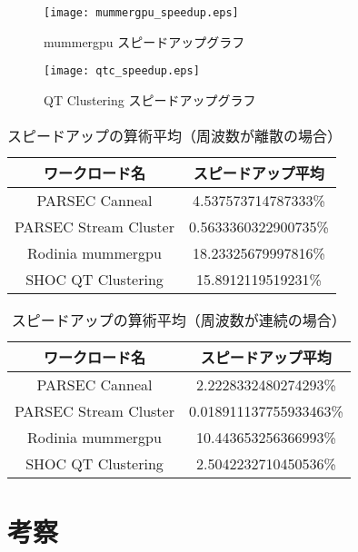 \begin{figure}[t]
 \begin{center}
  \texttt{[image: mummergpu\_speedup.eps]}
 \end{center}
 \caption{mummergpu スピードアップグラフ}
 \label{fig:mummergpu_speedup}
\end{figure}

\begin{figure}[t]
 \begin{center}
  \texttt{[image: qtc\_speedup.eps]}
 \end{center}
 \caption{QT Clustering スピードアップグラフ}
 \label{fig:qtclustering_speedup}
\end{figure}

\begin{table}[t]
\begin{center}\begin{tabular}{|c|c|}
\hline ワークロード名 & スピードアップ平均 \\
\hline PARSEC Canneal & 4.537573714787333\%\\
\hline PARSEC Stream Cluster & 0.5633360322900735\%\\
\hline Rodinia mummergpu & 18.23325679997816\%\\
\hline SHOC QT Clustering & 15.8912119519231\%\\
\hline \end{tabular} \caption{スピードアップの算術平均（周波数が離散の場合）}\label{tbl:parsec}
\end{center}
\end{table}

\begin{table}[t]
\begin{center}\begin{tabular}{|c|c|}
\hline ワークロード名 & スピードアップ平均 \\
\hline PARSEC Canneal & 2.2228332480274293\%\\
\hline PARSEC Stream Cluster & 0.018911137755933463\%\\
\hline Rodinia mummergpu & 10.443653256366993\%\\
\hline SHOC QT Clustering & 2.5042232710450536\%\\
\hline \end{tabular} \caption{スピードアップの算術平均（周波数が連続の場合）}\label{tbl:parsec}
\end{center}
\end{table}


\section{考察}
\label{sec:discussion}

